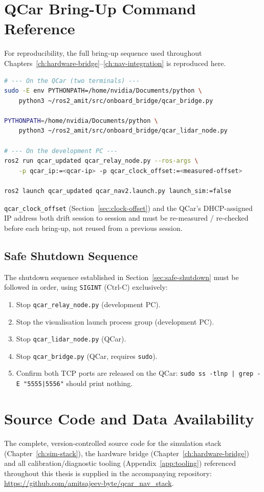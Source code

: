 \section{QCar Bring-Up Command Reference}
\label{app:commands}

For reproducibility, the full bring-up sequence used throughout
Chapters~\ref{ch:hardware-bridge}--\ref{ch:nav-integration} is
reproduced here.

\begin{lstlisting}[language=bash,caption={QCar bring-up (two onboard terminals, two development-PC terminals).}]
# --- On the QCar (two terminals) ---
sudo -E env PYTHONPATH=/home/nvidia/Documents/python \
    python3 ~/ros2_amit/src/onboard_bridge/qcar_bridge.py

PYTHONPATH=/home/nvidia/Documents/python \
    python3 ~/ros2_amit/src/onboard_bridge/qcar_lidar_node.py

# --- On the development PC ---
ros2 run qcar_updated qcar_relay_node.py --ros-args \
    -p qcar_ip:=<qcar-ip> -p qcar_clock_offset:=<measured-offset>

ros2 launch qcar_updated qcar_nav2.launch.py launch_sim:=false
\end{lstlisting}

\texttt{qcar\_clock\_offset} (Section~\ref{sec:clock-offset}) and the
QCar's DHCP-assigned IP address both drift session to session and
must be re-measured / re-checked before each bring-up, not reused
from a previous session.

\subsection{Safe Shutdown Sequence}
\label{app:shutdown}

The shutdown sequence established in Section~\ref{sec:safe-shutdown}
must be followed in order, using \texttt{SIGINT} (Ctrl-C) exclusively:

\begin{enumerate}
  \item Stop \texttt{qcar\_relay\_node.py} (development PC).
  \item Stop the visualisation launch process group (development PC).
  \item Stop \texttt{qcar\_lidar\_node.py} (QCar).
  \item Stop \texttt{qcar\_bridge.py} (QCar, requires \texttt{sudo}).
  \item Confirm both TCP ports are released on the QCar:
    \texttt{sudo ss -tlnp | grep -E "5555|5556"} should print nothing.
\end{enumerate}

\section{Source Code and Data Availability}
\label{app:source-availability}

The complete, version-controlled source code for the simulation
stack (Chapter~\ref{ch:sim-stack}), the hardware bridge
(Chapter~\ref{ch:hardware-bridge}) and all calibration/diagnostic
tooling (Appendix~\ref{app:tooling}) referenced throughout this
thesis is supplied in the accompanying repository:
\url{https://github.com/amitsajeev-byte/qcar_nav_stack}.
